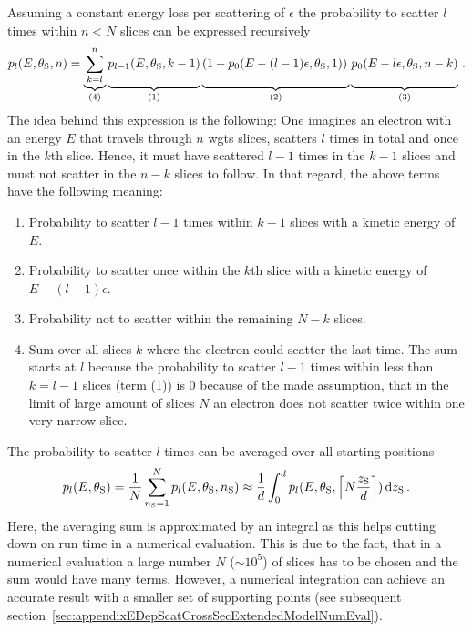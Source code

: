 Assuming a constant energy loss per scattering of $\epsilon$ the probability to scatter $l$ times within $n<N$ slices can be expressed recursively
\begin{equation}
	\label{eq:appendixEDepScatCrossSecExtendedModelFormalismCore}
    p_l(E,\thetaSource,n) =
    \underbrace{
        \sum_{k=l}^{n}
    }_{(4)}
    \underbrace{
        p_{l-1}(E,\thetaSource,k-1)
        \vphantom{\sum_{k=l}^{n}}
    }_{(1)}
    \underbrace{
    \left(
        1-p_0(E-(l-1)\epsilon,\thetaSource,1)
    \right)
    \vphantom{\sum_{k=l}^{n}}
    }_{(2)}
    \underbrace{
        p_0(E-l\epsilon,\thetaSource,n-k)
        \vphantom{\sum_{k=l}^{n}}
    }_{(3)}
    \fullstop
\end{equation}
The idea behind this expression is the following: One imagines an electron with an energy $E$ that travels through $n$ \gls{wgts} slices, scatters $l$ times in total and once in the $k$th slice. Hence, it must have scattered $l-1$ times in the $k-1$ slices and must not scatter in the $n-k$ slices to follow. In that regard, the above terms have the following meaning:
\begin{enumerate}[(1)]
    \item Probability to scatter $l-1$ times within $k-1$ slices with a kinetic energy of $E$.
    \item Probability to scatter once within the $k$th slice with a kinetic energy of $E-(l-1)\epsilon$.
    \item Probability not to scatter within the remaining $N-k$ slices.
    \item Sum over all slices $k$ where the electron could scatter the last time. The sum starts at $l$ because the probability to scatter $l-1$ times within less than $k=l-1$ slices (term (1)) is 0 because of the made assumption, that in the limit of large amount of slices $N$ an electron does not scatter twice within one very narrow slice.
\end{enumerate}
The probability to scatter $l$ times can be averaged over all starting positions
\begin{equation}
    \label{eq:appendixEDepScatCrossSecExtendedModelFormalismZAverage}
    \bar{p}_l(E,\theta_\mathrm{S}) = 
    \frac{1}{N}
    \sum_{n_\mathrm{S}=1}^{N} p_l(E,\theta_\mathrm{S},n_\mathrm{S}) \approx
    \frac{1}{d}
    \int_{0}^{d}
        p_l(E,\theta_\mathrm{S},
            \left\lceil N \frac{z_\mathrm{S}}{d}\right\rceil
        )
    \mathop{}\!\mathrm{d} z_\mathrm{S}
    \text{\,.}
\end{equation}
Here, the averaging sum is approximated by an integral as this helps cutting down on run time in a numerical evaluation. This is due to the fact, that in a numerical evaluation a large number $N$ ($\sim10^5$) of slices has to be chosen and the sum would have many terms. However, a numerical integration can achieve an accurate result with a smaller set of supporting points (see subsequent section~\ref{sec:appendixEDepScatCrossSecExtendedModelNumEval}). 

